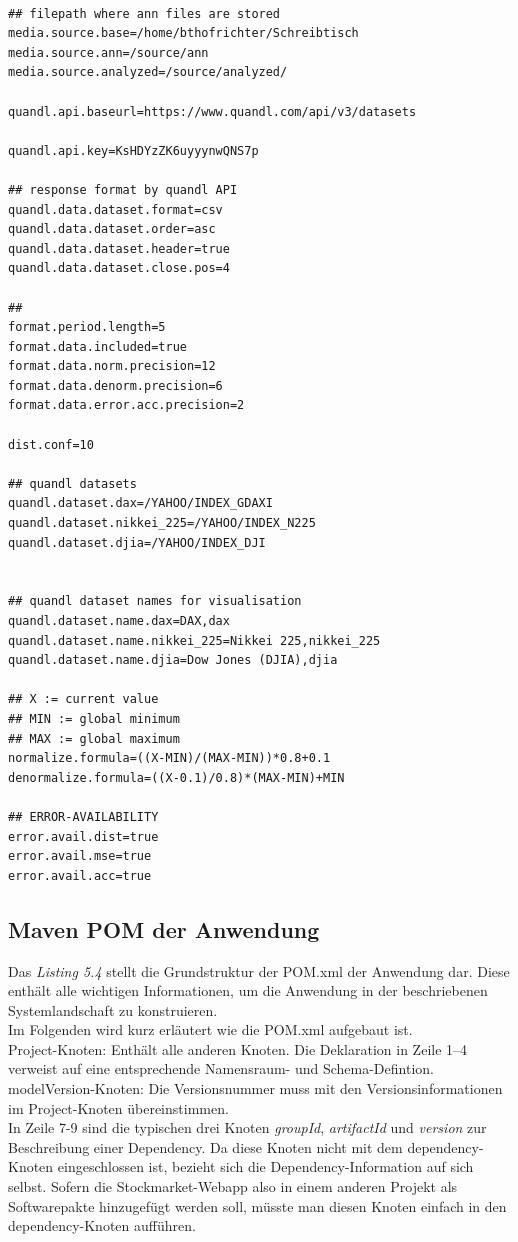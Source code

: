 \begin{lstlisting}[basicstyle=\scriptsize, caption=app.properties - Konfigurationsdatei der Stockmarket-Webapp]

## filepath where ann files are stored
media.source.base=/home/bthofrichter/Schreibtisch
media.source.ann=/source/ann
media.source.analyzed=/source/analyzed/

quandl.api.baseurl=https://www.quandl.com/api/v3/datasets

quandl.api.key=KsHDYzZK6uyyynwQNS7p

## response format by quandl API
quandl.data.dataset.format=csv
quandl.data.dataset.order=asc
quandl.data.dataset.header=true
quandl.data.dataset.close.pos=4

##
format.period.length=5
format.data.included=true
format.data.norm.precision=12
format.data.denorm.precision=6
format.data.error.acc.precision=2

dist.conf=10

## quandl datasets
quandl.dataset.dax=/YAHOO/INDEX_GDAXI
quandl.dataset.nikkei_225=/YAHOO/INDEX_N225
quandl.dataset.djia=/YAHOO/INDEX_DJI


## quandl dataset names for visualisation
quandl.dataset.name.dax=DAX,dax
quandl.dataset.name.nikkei_225=Nikkei 225,nikkei_225
quandl.dataset.name.djia=Dow Jones (DJIA),djia

## X := current value
## MIN := global minimum
## MAX := global maximum
normalize.formula=((X-MIN)/(MAX-MIN))*0.8+0.1
denormalize.formula=((X-0.1)/0.8)*(MAX-MIN)+MIN

## ERROR-AVAILABILITY
error.avail.dist=true
error.avail.mse=true
error.avail.acc=true
\end{lstlisting}

\subsection{Maven POM der Anwendung}

Das \emph{Listing 5.4} stellt die Grundstruktur der POM.xml der Anwendung dar. Diese enthält alle wichtigen Informationen, um die Anwendung in der beschriebenen Systemlandschaft zu konstruieren.\\
Im Folgenden wird kurz erläutert wie die POM.xml aufgebaut ist. \\
Project-Knoten: Enthält alle anderen Knoten. Die Deklaration in 
Zeile 1--4 verweist auf eine entsprechende Namensraum- und Schema-Defintion. 
modelVersion-Knoten: Die Versionsnummer muss mit den Versionsinformationen im Project-Knoten übereinstimmen.\\
In Zeile 7-9 sind die typischen drei Knoten \emph{groupId}, \emph{artifactId} und \emph{version} zur Beschreibung einer Dependency. Da diese Knoten nicht mit dem dependency-Knoten eingeschlossen ist, bezieht sich die Dependency-Information auf sich selbst. Sofern die Stockmarket-Webapp also in einem anderen Projekt als Softwarepakte hinzugefügt werden soll, müsste man diesen Knoten einfach in den dependency-Knoten aufführen.\\

